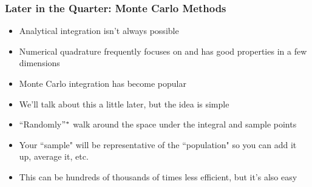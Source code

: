 \documentclass{beamer}
\begin{document}
\begin{frame}
\frametitle[alignment=center]{Later in the Quarter: Monte Carlo Methods}
\begin{itemize}
\item Analytical integration isn't always possible
\bigskip
\item Numerical quadrature frequently focuses on and has good properties in a few dimensions
\bigskip
\item Monte Carlo integration has become popular
\bigskip
\item We'll talk about this a little later, but the idea is simple
\bigskip
\item ``Randomly$"^*$ walk around the space under the integral and sample points
\bigskip
\item Your ``sample" will be representative of the ``population" so you can add it up, average it, etc.
\bigskip
\item This can be hundreds of thousands of times less efficient, but it's also easy
\end{itemize}
\end{frame}
\end{document}

